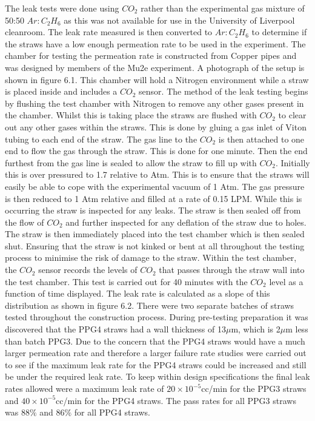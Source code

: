 The leak tests were done using $CO_{2}$ rather than the experimental gas mixture of 50:50 $Ar:C_{2}H_{6}$ as this was not available for use in the University of Liverpool cleanroom. The leak rate measured is then converted to $Ar:C_{2}H_{6}$ to determine if the straws have a low enough permeation rate to be used in the experiment. The chamber for testing the permeation rate is constructed from Copper pipes and was designed by members of the Mu2e experiment. A photograph of the setup is shown in figure 6.1. This chamber will hold a Nitrogen environment while a straw is placed inside and includes a $CO_{2}$ sensor. The method of the leak testing begins by flushing the test chamber with Nitrogen to remove any other gases present in the chamber. Whilst this is taking place the straws are flushed with $CO_{2}$ to clear out any other gases within the straws. This is done by gluing a gas inlet of Viton tubing to each end of the straw. The gas line to the $CO_{2}$ is then attached to one end to flow the gas through the straw. This is done for one minute. Then the end furthest from the gas line is sealed to allow the straw to fill up with $CO_{2}$. Initially this is over pressured to 1.7 relative to Atm. This is to ensure that the straws will easily be able to cope with the experimental vacuum of 1 Atm. The gas pressure is then reduced to 1 Atm relative and filled at a rate of 0.15 LPM. While this is occurring the straw is inspected for any leaks. The straw is then sealed off from the flow of $CO_{2}$ and further inspected for any deflation of the straw due to holes. The straw is then immediately placed into the test chamber which is then sealed shut. Ensuring that the straw is not kinked or bent at all throughout the testing process to minimise the risk of damage to the straw. Within the test chamber, the $CO_{2}$ sensor records the levels of $CO_{2}$ that passes through the straw wall into the test chamber. This test is carried out for 40 minutes with the $CO_{2}$ level as a function of time displayed. The leak rate is calculated as a slope of this distribution as shown in figure 6.2. There were two separate batches of straws tested throughout the construction process. During pre-testing preparation it was discovered that the PPG4 straws had a wall thickness of 13$\mu$m, which is 2$\mu$m less than batch PPG3. Due to the concern that the PPG4 straws would have a much larger permeation rate and therefore a larger failure rate studies were carried out to see if the maximum leak rate for the PPG4 straws could be increased and still be under the required leak rate. To keep within design specifications the final leak rates allowed were a maximum leak rate of $20\times10^{-5}$cc/min for the PPG3 straws and $40\times10^{-5}$cc/min for the PPG4 straws. The pass rates for all PPG3 straws was 88$\%$ and 86$\%$ for all PPG4 straws.

